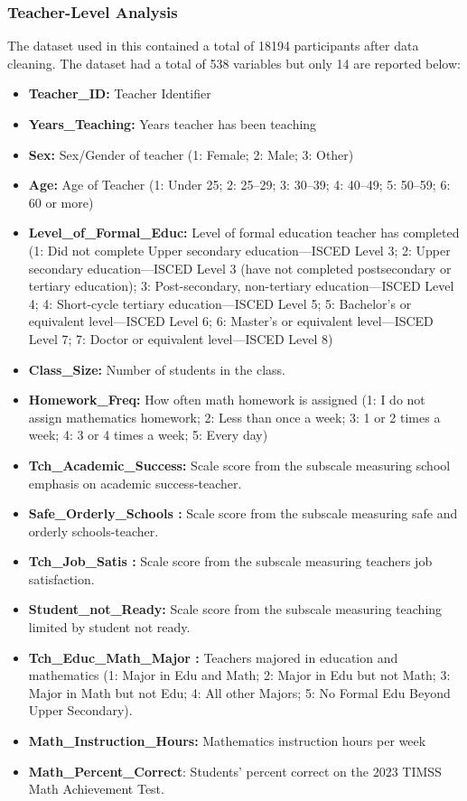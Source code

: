 \documentclass[
  letterpaper,
  DIV=11,
  numbers=noendperiod]{scrartcl}
\begin{document}
\subsubsection{Teacher-Level Analysis}\label{teacher-level-analysis}

The dataset used in this contained a total of 18194 participants after
data cleaning. The dataset had a total of 538 variables but only 14 are
reported below:

\begin{itemize}
\item
  \textbf{Teacher\_ID:} Teacher Identifier
\item
  \textbf{Years\_Teaching:} Years teacher has been teaching
\item
  \textbf{Sex:} Sex/Gender of teacher (1: Female; 2: Male; 3: Other)
\item
  \textbf{Age:} Age of Teacher (1: Under 25; 2: 25--29; 3: 30--39; 4:
  40--49; 5: 50--59; 6: 60 or more)
\item
  \textbf{Level\_of\_Formal\_Educ:} Level of formal education teacher
  has completed (1: Did not complete Upper secondary education---ISCED
  Level 3; 2: Upper secondary education---ISCED Level 3 (have not
  completed postsecondary or tertiary education); 3: Post-secondary,
  non-tertiary education---ISCED Level 4; 4: Short-cycle tertiary
  education---ISCED Level 5; 5: Bachelor's or equivalent level---ISCED
  Level 6; 6: Master's or equivalent level---ISCED Level 7; 7: Doctor or
  equivalent level---ISCED Level 8)
\item
  \textbf{Class\_Size:} Number of students in the class.
\item
  \textbf{Homework\_Freq:} How often math homework is assigned (1: I do
  not assign mathematics homework; 2: Less than once a week; 3: 1 or 2
  times a week; 4: 3 or 4 times a week; 5: Every day)
\item
  \textbf{Tch\_Academic\_Success:} Scale score from the subscale
  measuring school emphasis on academic success-teacher.
\item
  \textbf{Safe\_Orderly\_Schools :} Scale score from the subscale
  measuring safe and orderly schools-teacher.
\item
  \textbf{Tch\_Job\_Satis :} Scale score from the subscale measuring
  teachers job satisfaction.
\item
  \textbf{Student\_not\_Ready:} Scale score from the subscale measuring
  teaching limited by student not ready.
\item
  \textbf{Tch\_Educ\_Math\_Major :} Teachers majored in education and
  mathematics (1: Major in Edu and Math; 2: Major in Edu but not Math;
  3: Major in Math but not Edu; 4: All other Majors; 5: No Formal Edu
  Beyond Upper Secondary).
\item
  \textbf{Math\_Instruction\_Hours:} Mathematics instruction hours per
  week
\item
  \textbf{Math\_Percent\_Correct}: Students' percent correct on the 2023
  TIMSS Math Achievement Test.
\end{itemize}
\end{document}
